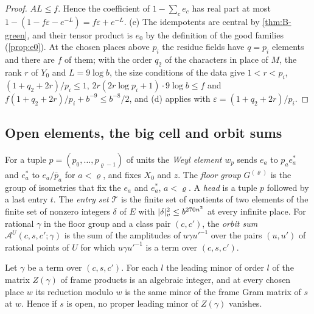 \begin{proof}
$AL\le f$. Hence the coefficient of $1-\sum_ce_c$ has real part at most $1-(1-f\varepsilon-e^{-L})=f\varepsilon+e^{-L}$.
(e) The idempotents are central by \cref{thm:B-green}, and their tensor product is $e_0$ by the definition of the good families (\cref{prop:e0}). At the chosen places above $p_i$ the residue fields have $q=p_i$
elements and there are $f$ of them; with the order $q_2$ of the characters in place of $M$, the rank $r$ of $Y_0$ and $L=9\log b$, the size conditions of the data give $1<r<p_i$, $(1+q_2+2r)/p_i\le1$,
$2r(2r\log p_i+1)\cdot9\log b\le f$ and $f(1+q_2+2r)/p_i+b^{-9}\le b^{-8}/2$, and (d) applies with $\varepsilon=(1+q_2+2r)/p_i$.
\end{proof}

\subsection{Open elements, the big cell and orbit sums}\label{ss:big-cell}
For a tuple $p=(p_0,\dots,p_{\varrho-1})$ of units the \emph{Weyl element} $w_p$ sends $e_a$ to $p_ae^*_a$ and $e^*_a$ to $e_a/\bar p_a$ for $a<\varrho$, and fixes $X_0$ and $z$. The
\emph{floor group} $G^{(\varrho)}$ is the group of isometries that fix the $e_a$ and $e^*_a$, $a<\varrho$. A \emph{head} is a tuple $p$ followed by a last entry $t$. The \emph{entry set} $\mathcal T$ is
the finite set of quotients of two elements of the finite set of nonzero integers $\delta$ of $E$ with $\lvert \delta\rvert_v^2\le b^{270n^2}$ at every infinite place. For
rational $\gamma$ in the floor group and a class pair $(c,c')$, the \emph{orbit sum} $\mathcal A^U(c,s,c';\gamma)$ is the sum of the amplitudes of $u\gamma u'^{-1}$ over the pairs $(u,u')$ of
rational points of $U$ for which $u\gamma u'^{-1}$ is a term over $(c,s,c')$.

\begin{lemma}\label{lem:big-cell}
Let $\gamma$ be a term over $(c,s,c')$. For each $l$ the leading minor of order $l$ of the matrix $Z(\gamma)$ of frame products is an algebraic integer, and at every chosen place $w$
its reduction modulo $w$ is the same minor of the frame Gram matrix of $s$ at $w$. Hence if $s$ is open, no proper leading minor of $Z(\gamma)$ vanishes.
\end{lemma}

